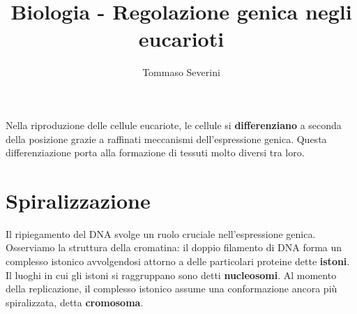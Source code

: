 \documentclass[10pt,a4paper]{article}
\author{Tommaso Severini}
\title{Biologia - Regolazione genica negli eucarioti}
\begin{document}
	\maketitle
	
	Nella riproduzione delle cellule eucariote, le cellule si \textbf{differenziano} a seconda della posizione grazie a raffinati meccanismi dell'espressione genica. Questa differenziazione porta alla formazione di tessuti molto diversi tra loro.
	
	\section{Spiralizzazione}
	
	Il ripiegamento del DNA svolge un ruolo cruciale nell'espressione genica. Osserviamo la struttura della cromatina: il doppio filamento di DNA forma un complesso istonico avvolgendosi attorno a delle particolari proteine dette \textbf{istoni}. Il luoghi in cui gli istoni si raggruppano sono detti \textbf{nucleosomi}. Al momento della replicazione, il complesso istonico assume una conformazione ancora più spiralizzata, detta \textbf{cromosoma}. 
	
\end{document}
